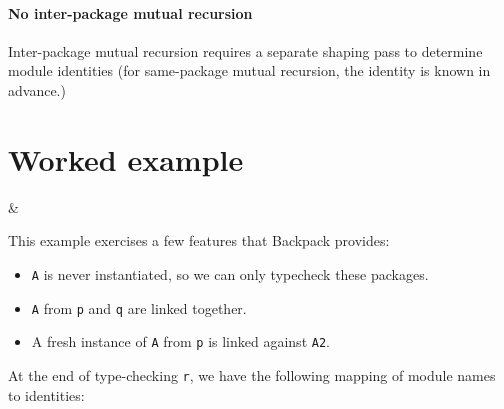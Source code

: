 \documentclass{article}
\begin{document}
\paragraph{No inter-package mutual recursion} Inter-package mutual recursion requires a separate shaping pass
to determine module identities (for same-package mutual recursion, the identity is known in advance.)

\section{Worked example}

\begin{example}
 &
 \\
\end{example}

This example exercises a few features that Backpack provides:

\begin{itemize}
\item \verb|A| is never instantiated, so we can only typecheck these packages.
\item \verb|A| from \verb|p| and \verb|q| are linked together.
\item A fresh instance of \verb|A| from \verb|p| is linked against \verb|A2|.
\end{itemize}

At the end of type-checking \verb|r|, we have the following mapping of
module names to identities:
\end{document}
